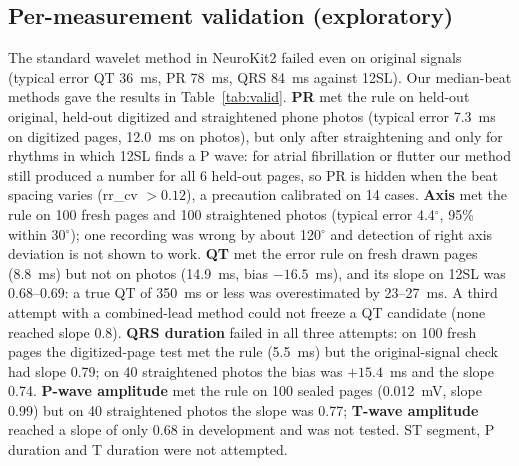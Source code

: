 \documentclass[conference]{IEEEtran}
\begin{document}
\subsection{Per-measurement validation (exploratory)}
The standard wavelet method in NeuroKit2 failed even on original signals (typical error QT 36~ms, PR 78~ms, QRS 84~ms against 12SL). Our median-beat methods gave the results in Table~\ref{tab:valid}. \textbf{PR} met the rule on held-out original, held-out digitized and straightened phone photos (typical error 7.3~ms on digitized pages, 12.0~ms on photos), but only after straightening and only for rhythms in which 12SL finds a P wave: for atrial fibrillation or flutter our method still produced a number for all 6 held-out pages, so PR is hidden when the beat spacing varies (rr\_cv $>0.12$), a precaution calibrated on 14 cases. \textbf{Axis} met the rule on 100 fresh pages and 100 straightened photos (typical error 4.4$^\circ$, 95\% within 30$^\circ$); one recording was wrong by about 120$^\circ$ and detection of right axis deviation is not shown to work. \textbf{QT} met the error rule on fresh drawn pages (8.8~ms) but not on photos (14.9~ms, bias $-16.5$~ms), and its slope on 12SL was 0.68--0.69: a true QT of 350~ms or less was overestimated by 23--27~ms. A third attempt with a combined-lead method could not freeze a QT candidate (none reached slope 0.8). \textbf{QRS duration} failed in all three attempts: on 100 fresh pages the digitized-page test met the rule (5.5~ms) but the original-signal check had slope 0.79; on 40 straightened photos the bias was $+15.4$~ms and the slope 0.74. \textbf{P-wave amplitude} met the rule on 100 sealed pages (0.012~mV, slope 0.99) but on 40 straightened photos the slope was 0.77; \textbf{T-wave amplitude} reached a slope of only 0.68 in development and was not tested. ST segment, P duration and T duration were not attempted.
\end{document}
